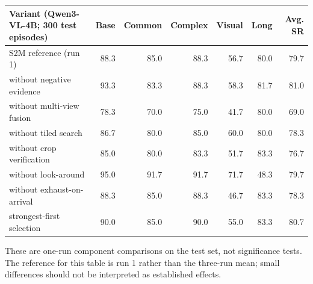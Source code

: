 \begin{tabular}{lrrrrrr}
\toprule
Variant (Qwen3-VL-4B; 300 test episodes) & Base & Common & Complex & Visual & Long & Avg. SR \\
\midrule
S2M reference (run 1) & 88.3 & 85.0 & 88.3 & 56.7 & 80.0 & 79.7 \\
without negative evidence & 93.3 & 83.3 & 88.3 & 58.3 & 81.7 & 81.0 \\
without multi-view fusion & 78.3 & 70.0 & 75.0 & 41.7 & 80.0 & 69.0 \\
without tiled search & 86.7 & 80.0 & 85.0 & 60.0 & 80.0 & 78.3 \\
without crop verification & 85.0 & 80.0 & 83.3 & 51.7 & 83.3 & 76.7 \\
without look-around & 95.0 & 91.7 & 91.7 & 71.7 & 48.3 & 79.7 \\
without exhaust-on-arrival & 88.3 & 85.0 & 88.3 & 46.7 & 83.3 & 78.3 \\
strongest-first selection & 90.0 & 85.0 & 90.0 & 55.0 & 83.3 & 80.7 \\
\bottomrule
\end{tabular}

\vspace{0.25em}\footnotesize These are one-run component comparisons on the test set, not significance tests. The
reference for this table is run 1 rather than the three-run mean; small differences should not be interpreted as
established effects.

